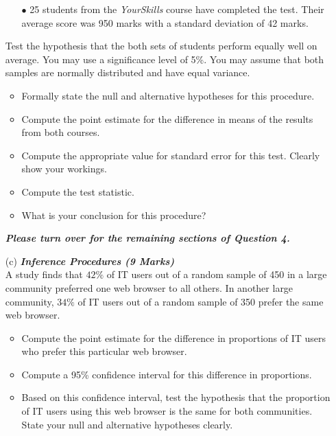 \begin{itemize}
\begin{itemize}
\item[$\bullet$]25 students from the \textit{YourSkills} course have completed the test. Their average score was 950 marks with a standard deviation of 42 marks.
\end{itemize}

Test the hypothesis that the both sets of students perform equally well on average. You may use a significance level of 5\%. You may assume that both samples are normally distributed and have equal variance.
\begin{itemize}
\item  Formally state the null and alternative hypotheses for this procedure.
\item  Compute the point estimate for the difference in means of the results from both courses.
\item  Compute the appropriate value for standard error for this test. Clearly show your workings.
\item   Compute the test statistic.
\item   What is your conclusion for this procedure?
\end{itemize}
{
\normalsize
\textit{\textbf{Please turn over for the remaining sections of Question 4.}}
}
\newpage
\item[(c)] \textbf{\textit{Inference Procedures (9 Marks)}}\\A study finds that $42\%$ of IT users out of a random sample of 450 in a large
community preferred one web browser to all others. In another large community, $34\%$ of IT users out of a random sample of 350 prefer the same web browser.

\begin{itemize}
\item  Compute the point estimate for the difference in proportions of IT users who prefer this particular web browser.
\item  Compute a 95\% confidence interval for this difference in proportions.
\item  Based on this confidence interval, test the hypothesis that the proportion of IT users using this web browser is the same for both communities. State your null and alternative hypotheses clearly.
\end{itemize}

\end{itemize}

\newpage
